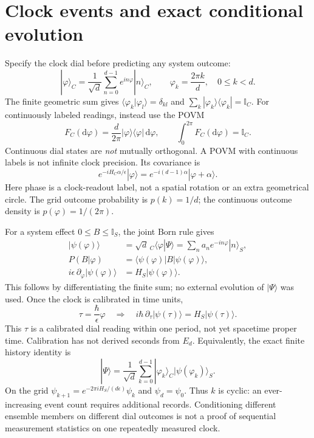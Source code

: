 \documentclass[11pt,a4paper]{article}
\newcommand{\dd}{\mathrm d}
\newcommand{\id}{\mathbb I}
\newcommand{\ket}[1]{|#1\rangle}
\newcommand{\bra}[1]{\langle#1|}
\begin{document}
\newpage
\section{Clock events and exact conditional evolution}
Specify the clock dial before predicting any system outcome:
\begin{equation}\label{eq:clock}
 \ket\varphi_C=\frac1{\sqrt d}\sum_{n=0}^{d-1}
                  e^{in\varphi}\ket n_C,\qquad
 \varphi_k=\frac{2\pi k}{d},\quad 0\leq k<d.
\end{equation}
The finite geometric sum gives
$\langle\varphi_k|\varphi_l\rangle=\delta_{kl}$ and
$\sum_k\ket{\varphi_k}\bra{\varphi_k}=\id_C$.
For continuously labeled readings, instead use the POVM
\begin{equation}
 F_C(\dd\varphi)=\frac d{2\pi}\ket\varphi\bra\varphi\,\dd\varphi,
 \qquad \int_0^{2\pi}F_C(\dd\varphi)=\id_C .
\end{equation}
Continuous dial states are \emph{not} mutually orthogonal. A POVM with
continuous labels is not infinite clock precision. Its covariance is
\begin{equation}
 e^{-iH_C\alpha/\epsilon}\ket\varphi
       =e^{-i(d-1)\alpha}\ket{\varphi+\alpha}.
\end{equation}
Here phase is a clock-readout label, not a spatial rotation or an extra
geometrical circle. The grid outcome probability is $p(k)=1/d$;
the continuous outcome density is $p(\varphi)=1/(2\pi)$.

For a system effect $0\leq B\leq\id_S$, the joint Born rule gives
\begin{align}
 \ket{\psi(\varphi)}
    &=\sqrt d\,{}_C\bra\varphi\Psi\rangle
      =\sum_n a_n e^{-in\varphi}\ket n_S,\\
 P(B|\varphi)&=\bra{\psi(\varphi)}B\ket{\psi(\varphi)},\\
 i\epsilon\,\partial_\varphi\ket{\psi(\varphi)}
    &=H_S\ket{\psi(\varphi)}.\label{eq:conditional}
\end{align}
This follows by differentiating the finite sum; no external evolution
of $\ket\Psi$ was used. Once the clock is calibrated in time units,
\begin{equation}
 \tau=\frac{\hbar}{\epsilon}\varphi
 \quad\Longrightarrow\quad
 i\hbar\,\partial_\tau\ket{\psi(\tau)}=H_S\ket{\psi(\tau)} .
\end{equation}
This $\tau$ is a calibrated dial reading within one period, not yet
spacetime proper time. Calibration has not derived seconds from $E_d$.
Equivalently, the exact finite history identity is
\begin{equation}
 \ket\Psi=\frac1{\sqrt d}\sum_{k=0}^{d-1}
         \ket{\varphi_k}_C\ket{\psi(\varphi_k)}_S .
\end{equation}
On the grid $\psi_{k+1}=e^{-2\pi iH_S/(d\epsilon)}\psi_k$ and
$\psi_d=\psi_0$. Thus $k$ is cyclic: an ever-increasing event count
requires additional records. Conditioning different ensemble members
on different dial outcomes is not a proof of sequential measurement
statistics on one repeatedly measured clock.
\end{document}
